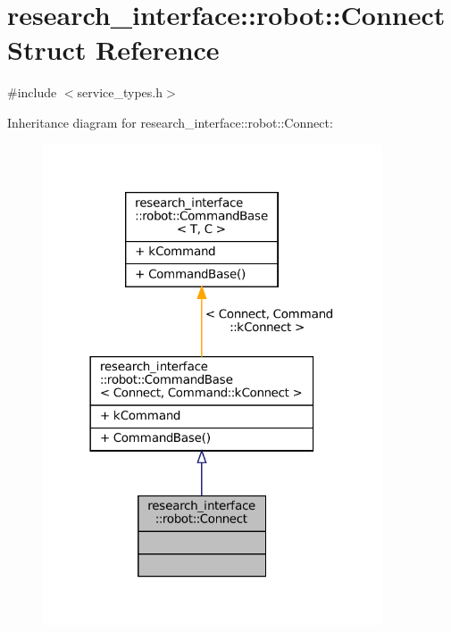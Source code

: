 \hypertarget{structresearch__interface_1_1robot_1_1Connect}{}\section{research\+\_\+interface\+:\+:robot\+:\+:Connect Struct Reference}
\label{structresearch__interface_1_1robot_1_1Connect}


{\ttfamily \#include $<$service\+\_\+types.\+h$>$}



Inheritance diagram for research\+\_\+interface\+:\+:robot\+:\+:Connect\+:
\nopagebreak
\begin{figure}[H]
\begin{center}
\leavevmode
\includegraphics[width=285pt]{structresearch__interface_1_1robot_1_1Connect__inherit__graph}
\end{center}
\end{figure}


